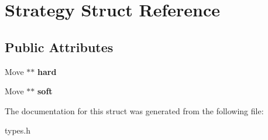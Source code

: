 \hypertarget{struct_strategy}{\section{Strategy Struct Reference}
\label{struct_strategy}
}
\subsection*{Public Attributes}
\begin{DoxyCompactItemize}
\item 
\hypertarget{struct_strategy_ade5b9b2f3a1b61ea66396fa058eec94a}{Move $\ast$$\ast$ {\bfseries hard}}\label{struct_strategy_ade5b9b2f3a1b61ea66396fa058eec94a}

\item 
\hypertarget{struct_strategy_ab4fb8970925be2599674767667b96a77}{Move $\ast$$\ast$ {\bfseries soft}}\label{struct_strategy_ab4fb8970925be2599674767667b96a77}

\end{DoxyCompactItemize}


The documentation for this struct was generated from the following file\-:\begin{DoxyCompactItemize}
\item 
types.\-h\end{DoxyCompactItemize}
